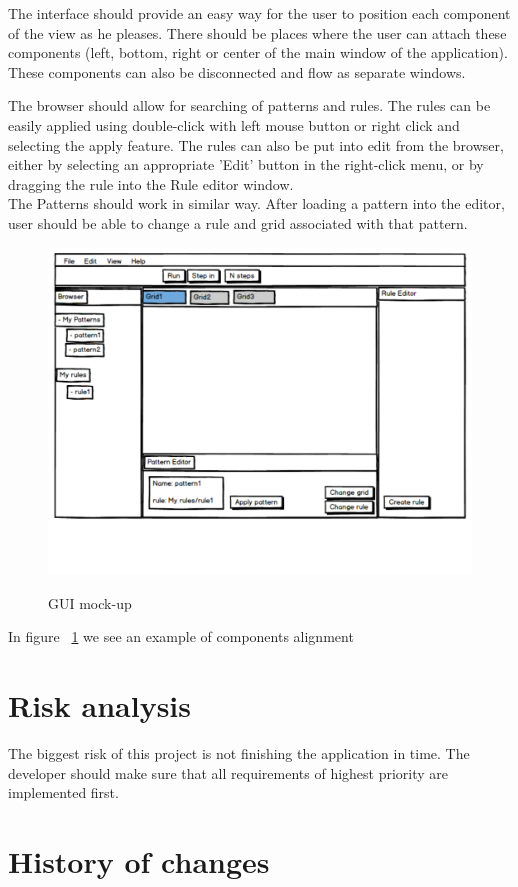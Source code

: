 \documentclass{article}
\begin{document}
	The interface should provide an easy way for the user to position each component of the view as he pleases.
	There should be places where the user can attach these components (left, bottom, right or center of the main window of the application).
	These components can also be disconnected and flow as separate windows.
	
	The browser should allow for searching of patterns and rules.
	The rules can be easily applied using double-click with left mouse button
	or right click and selecting the apply feature.
	The rules can also be put into edit from the browser, either by selecting an
	appropriate 'Edit' button in the right-click menu, or by dragging the rule into the
	Rule editor window. \\
	The Patterns should work in similar way. After loading a pattern into the editor, user should be able to change a rule and grid associated with that pattern.
	

	\begin{figure}[h!]
	  \caption{GUI mock-up}
		\includegraphics[page=1,width=1.5\textwidth, center]{images/gui_mockup.pdf}
	  \label{fig:gui}
	\end{figure}

	In figure ~\ref{fig:gui} we see an example of components alignment
	

\section{Risk analysis}

The biggest risk of this project is not finishing the application in time.
The developer should make sure that all requirements of highest priority are implemented
first.

\section{History of changes}
\end{document}
